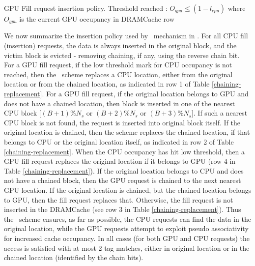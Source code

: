 \begin{table}[htb]
	\centering
	
	\caption{GPU Fill request insertion policy. Threshold reached : $O_{gpu}\le(1-l_{cpu})$ where $O_{gpu}$ is the current GPU occupancy in DRAMCache row}
	\label{chaining-replacement}
\end{table}

\par We now summarize the insertion policy used by \chaining\ mechanism in \cachename. For all CPU fill (insertion) requests, the data is always inserted in the original block, and the victim block is evicted - removing chaining, if any, using the reverse chain bit. For a GPU fill request, if the low threshold mark for CPU occupancy is not reached, then the \chaining\ scheme replaces a CPU location, either from the original location or from the chained location, as indicated in row 1 of Table \ref{chaining-replacement}. For a GPU fill request, if the original location belongs to GPU and does not have a chained location, then block is inserted in one of the nearest CPU block [$(B+1)\%N_s$ or $(B+2)\%N_s$ or $(B+3)\%N_s$]. If such a nearest CPU block is not found, the request is inserted into original block itself. If the original location is chained, then the scheme replaces the chained location, if that belongs to CPU or the original location itself, as indicated in row 2 of Table \ref{chaining-replacement}. When the CPU occupancy has hit low threshold, then a GPU fill request replaces the original location if it belongs to GPU (row 4 in Table \ref{chaining-replacement}). If the original location belongs to CPU and does not have a chained block, then the GPU request is chained to the next nearest GPU location. If the original location is chained, but the chained location belongs to GPU, then the fill request replaces that. Otherwise, the fill request is not inserted in the DRAMCache (see row 3 in Table \ref{chaining-replacement}). Thus the \chaining\ scheme ensures, as far as possible, the CPU requests can find the data in the original location, while the GPU requests attempt to exploit pseudo associativity for increased cache occupancy. In all cases (for both GPU and CPU requests) the access is satisfied with at most 2 tag matches, either in original location or in the chained location (identified by the chain bits). 

